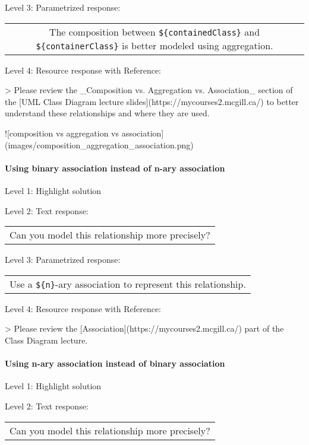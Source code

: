 \noindent Level 3: Parametrized response: \medskip

\begin{tabular}{|c}
The composition between \verb|${containedClass}| and \verb|${containerClass}| is better modeled using aggregation.
\end{tabular} \medskip

\noindent Level 4: Resource response with Reference:

> Please review the _Composition vs. Aggregation vs. Association_ section of 
the [UML Class Diagram lecture slides](https://mycourses2.mcgill.ca/) to 
better understand these relationships and where they are used.

![composition vs aggregation vs association](images/composition_aggregation_association.png)


\paragraph{Using binary association instead of n-ary association}

\noindent Level 1: Highlight solution \medskip

\noindent Level 2: Text response: \medskip

\begin{tabular}{|c}
Can you model this relationship more precisely?
\end{tabular} \medskip

\noindent Level 3: Parametrized response: \medskip

\begin{tabular}{|c}
Use a \verb|${n}|-ary association to represent this relationship.
\end{tabular} \medskip

\noindent Level 4: Resource response with Reference:

> Please review the [Association](https://mycourses2.mcgill.ca/) part of the Class Diagram lecture.


\paragraph{Using n-ary association instead of binary association}

\noindent Level 1: Highlight solution \medskip

\noindent Level 2: Text response: \medskip

\begin{tabular}{|c}
Can you model this relationship more precisely?
\end{tabular} \medskip

